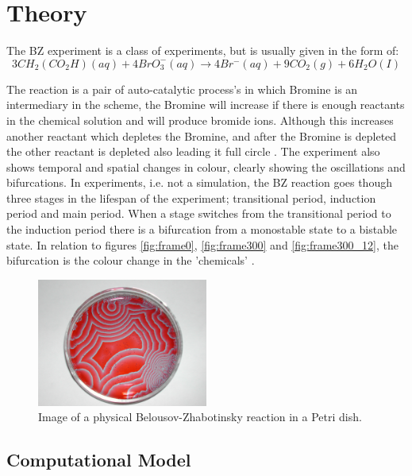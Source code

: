 \documentclass[12pt, A4]{article}
\begin{document}
\section{Theory} %
\label{sec:Theory}

The BZ experiment is a class of experiments, but is usually given in the form of: 
\begin{equation}
  3CH_2(CO_2H)(aq)+4BrO^-_3(aq)\rightarrow 4Br^-(aq)+9CO_2(g)+6H_2O(I)
\end{equation}

The reaction is a pair of auto-catalytic process's in which Bromine is an intermediary in the 
scheme, the Bromine will increase if there is enough reactants in the chemical solution and 
will produce bromide ions. Although this increases another reactant which depletes the Bromine, 
and after the Bromine is depleted the other reactant is depleted also leading it full circle \cite{lister1995classic}.
The experiment also shows temporal and spatial changes in colour, clearly showing 
the oscillations and bifurcations. In experiments, i.e. not a simulation, the BZ reaction 
goes though three stages in the lifespan of the experiment; transitional period, 
induction period and main period. When a stage switches from the transitional period to 
the induction period there is a bifurcation from a monostable state to a bistable state. 
In relation to figures \ref{fig:frame0}, \ref{fig:frame300} and \ref{fig:frame300_12}, the bifurcation 
is the colour change in the 'chemicals' \cite{chen2000mathematical}.


\begin{figure}[H]
  \begin{center}
    \includegraphics[width=0.5\textwidth]{bz.jpg}
  \end{center}
  \caption{Image of a physical Belousov-Zhabotinsky reaction in a Petri dish.}
  \label{fig:}
\end{figure}



\subsection{Computational Model} %
\label{sub:Computational Model}
\end{document}

